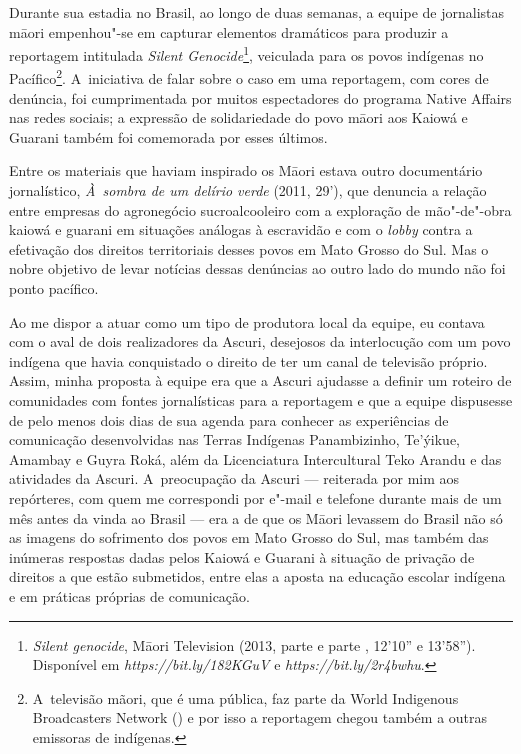 Durante sua estadia no Brasil, ao longo de duas semanas, a equipe de
jornalistas m\=aori empenhou"-se em capturar elementos dramáticos para
produzir a reportagem intitulada \emph{Silent Genocide}\footnote[7]{\emph{Silent
genocide}, M\=aori Television (2013, parte  e parte ,
12'10'' e 13'58''). Disponível em
\emph{https://bit.ly/182KGuV} e \emph{https://bit.ly/2r4bwhu}.},
veiculada para os povos indígenas no Pacífico\footnote[8]{A~televisão
mãori, que é uma  pública, faz parte da World Indigenous Broadcasters
Network () e por isso a reportagem chegou também a outras
emissoras de  indígenas. }. A~iniciativa de falar sobre o caso em uma
reportagem, com cores de denúncia, foi cumprimentada por muitos
espectadores do programa Native Affairs nas redes sociais; a expressão
de solidariedade do povo m\=aori aos Kaiowá e Guarani também foi
comemorada por esses últimos.

Entre os materiais que haviam inspirado os M\=aori estava outro
documentário jornalístico, \emph{À~sombra de um delírio verde} (2011, 29’), que denuncia a relação entre empresas do agronegócio sucroalcooleiro
com a exploração de mão"-de"-obra kaiowá e guarani em situações análogas
à escravidão e com o \emph{lobby} contra a efetivação dos direitos
territoriais desses povos em Mato Grosso do Sul. Mas o nobre objetivo
de levar notícias dessas denúncias ao outro lado do mundo não foi ponto
pacífico.

Ao me dispor a atuar como um tipo de produtora local da equipe, eu
contava com o aval de dois realizadores da Ascuri, desejosos da
interlocução com um povo indígena que havia conquistado o direito de
ter um canal de televisão próprio. Assim, minha proposta à equipe era
que a Ascuri ajudasse a definir um roteiro de comunidades com fontes
jornalísticas para a reportagem e que a equipe dispusesse de pelo menos
dois dias de sua agenda para conhecer as experiências de comunicação
desenvolvidas nas Terras Indígenas Panambizinho, Te’ýikue, Amambay e
Guyra Roká, além da Licenciatura Intercultural Teko Arandu e das
atividades da Ascuri. A~preocupação da Ascuri --- reiterada por mim aos
repórteres, com quem me correspondi por e"-mail e telefone durante mais
de um mês antes da vinda ao Brasil --- era a de que os M\=aori levassem
do Brasil não só as imagens do sofrimento dos povos em Mato Grosso do
Sul, mas também das inúmeras respostas dadas pelos Kaiowá e Guarani à
situação de privação de direitos a que estão submetidos, entre elas a
aposta na educação escolar indígena e em práticas próprias de
comunicação. 

